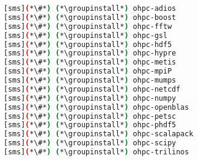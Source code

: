 \begin{lstlisting}[language=bash,keywords={},upquote=true,keepspaces]
[sms](*\#*) (*\groupinstall*) ohpc-adios        
[sms](*\#*) (*\groupinstall*) ohpc-boost        
[sms](*\#*) (*\groupinstall*) ohpc-fftw         
[sms](*\#*) (*\groupinstall*) ohpc-gsl          
[sms](*\#*) (*\groupinstall*) ohpc-hdf5         
[sms](*\#*) (*\groupinstall*) ohpc-hypre        
[sms](*\#*) (*\groupinstall*) ohpc-metis        
[sms](*\#*) (*\groupinstall*) ohpc-mpiP         
[sms](*\#*) (*\groupinstall*) ohpc-mumps        
[sms](*\#*) (*\groupinstall*) ohpc-netcdf       
[sms](*\#*) (*\groupinstall*) ohpc-numpy        
[sms](*\#*) (*\groupinstall*) ohpc-openblas     
[sms](*\#*) (*\groupinstall*) ohpc-petsc        
[sms](*\#*) (*\groupinstall*) ohpc-phdf5        
[sms](*\#*) (*\groupinstall*) ohpc-scalapack    
[sms](*\#*) (*\groupinstall*) ohpc-scipy        
[sms](*\#*) (*\groupinstall*) ohpc-trilinos     
\end{lstlisting}
